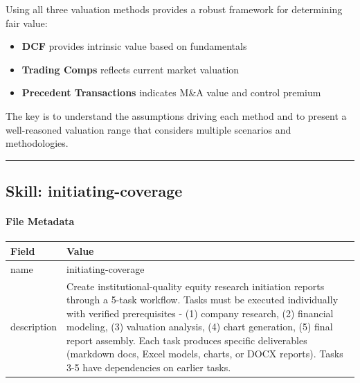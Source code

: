 \documentclass[11pt]{article}
\begin{document}
Using all three valuation methods provides a robust framework for determining fair value:


\begin{itemize}[leftmargin=*,itemsep=2pt,topsep=2pt]
\item {} \textbf{DCF} provides intrinsic value based on fundamentals
\item {} \textbf{Trading Comps} reflects current market valuation
\item {} \textbf{Precedent Transactions} indicates M\&A value and control premium
\end{itemize}

The key is to understand the assumptions driving each method and to present a well-reasoned valuation range that considers multiple scenarios and methodologies.


\vspace{0.8em}\hrule\vspace{0.8em}

\subsection{Skill: initiating-coverage}\label{file:skills-initiating-coverage-SKILL-md}

\paragraph{File Metadata}\mbox{}\par
\begingroup
\small
\setlength{\tabcolsep}{2pt}
\begin{longtable}{>{\RaggedRight\arraybackslash\hspace{0pt}}p{}>{\RaggedRight\arraybackslash\hspace{0pt}}p{}}
\toprule
{} \textbf{Field} & \textbf{Value} \\
\midrule
{} name & initiating-coverage \\
{} description & Create institutional-quality equity research initiation reports through a 5-task workflow. Tasks must be executed individually with verified prerequisites - (1) company research, (2) financial modeling, (3) valuation analysis, (4) chart generation, (5) final report assembly. Each task produces specific deliverables (markdown docs, Excel models, charts, or DOCX reports). Tasks 3-5 have dependencies on earlier tasks. \\
\bottomrule
\end{longtable}
\endgroup
\end{document}
